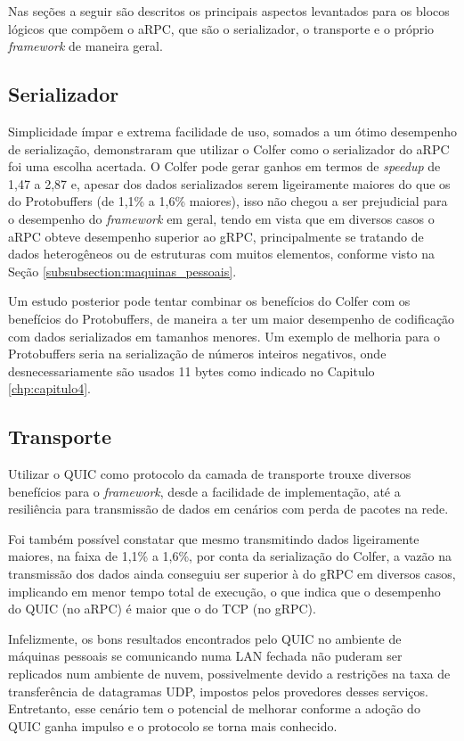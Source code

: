 Nas seções a seguir são descritos os principais aspectos levantados para os blocos lógicos que compõem o aRPC, que são o serializador, o transporte e o próprio \textit{framework} de maneira geral.

\subsection{Serializador}

Simplicidade ímpar e extrema facilidade de uso, somados a um ótimo desempenho de serialização, demonstraram que utilizar o Colfer como o serializador do aRPC foi uma escolha acertada. O Colfer pode gerar ganhos em termos de \textit{speedup} de 1,47 a 2,87 e, apesar dos dados serializados serem ligeiramente maiores do que os do Protobuffers (de 1,1\% a 1,6\% maiores), isso não chegou a ser prejudicial para o desempenho do \textit{framework} em geral, tendo em vista que em diversos casos o aRPC obteve desempenho superior ao gRPC, principalmente se tratando de dados heterogêneos ou de estruturas com muitos elementos, conforme visto na Seção \ref{subsubsection:maquinas_pessoais}.

Um estudo posterior pode tentar combinar os benefícios do Colfer com os benefícios do Protobuffers, de maneira a ter um maior desempenho de codificação com dados serializados em tamanhos menores. Um exemplo de melhoria para o Protobuffers seria na serialização de números inteiros negativos, onde desnecessariamente são usados 11 bytes como indicado no Capitulo \ref{chp:capitulo4}.

\subsection{Transporte}

Utilizar o QUIC como protocolo da camada de transporte trouxe diversos benefícios para o \textit{framework}, desde a facilidade de implementação, até a resiliência para transmissão de dados em cenários com perda de pacotes na rede.

Foi também possível constatar que mesmo transmitindo dados ligeiramente maiores, na faixa de 1,1\% a 1,6\%, por conta da serialização do Colfer, a vazão na transmissão dos dados ainda conseguiu ser superior à do gRPC em diversos casos, implicando em menor tempo total de execução, o que indica que o desempenho do QUIC (no aRPC) é maior que o do TCP (no gRPC).

Infelizmente, os bons resultados encontrados pelo QUIC no ambiente de máquinas pessoais se comunicando numa LAN fechada não puderam ser replicados num ambiente de nuvem, possivelmente devido a restrições na taxa de transferência de datagramas UDP, impostos pelos provedores desses serviços. Entretanto, esse cenário tem o potencial de melhorar conforme a adoção do QUIC ganha impulso e o protocolo se torna mais conhecido.

